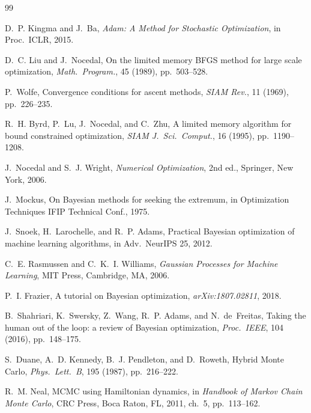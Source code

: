 \documentclass[11pt]{article}
\theoremstyle{definition}
\begin{document}

\begin{thebibliography}{99}

D.~P. Kingma and J.~Ba,
\textit{Adam: A Method for Stochastic Optimization},
in Proc.\ ICLR, 2015.

D.~C. Liu and J.~Nocedal,
On the limited memory BFGS method for large scale optimization,
\textit{Math.\ Program.}, 45 (1989), pp.~503--528.

P.~Wolfe,
Convergence conditions for ascent methods,
\textit{SIAM Rev.}, 11 (1969), pp.~226--235.

R.~H. Byrd, P.~Lu, J.~Nocedal, and C.~Zhu,
A limited memory algorithm for bound constrained optimization,
\textit{SIAM J.\ Sci.\ Comput.}, 16 (1995), pp.~1190--1208.

J.~Nocedal and S.~J. Wright,
\textit{Numerical Optimization}, 2nd ed.,
Springer, New York, 2006.

J.~Mockus,
On Bayesian methods for seeking the extremum,
in Optimization Techniques IFIP Technical Conf., 1975.

J.~Snoek, H.~Larochelle, and R.~P. Adams,
Practical Bayesian optimization of machine learning algorithms,
in Adv.\ NeurIPS 25, 2012.

C.~E. Rasmussen and C.~K.~I. Williams,
\textit{Gaussian Processes for Machine Learning},
MIT Press, Cambridge, MA, 2006.

P.~I. Frazier,
A tutorial on Bayesian optimization,
\textit{arXiv:1807.02811}, 2018.

B.~Shahriari, K.~Swersky, Z.~Wang, R.~P. Adams, and N.~de~Freitas,
Taking the human out of the loop: a review of Bayesian optimization,
\textit{Proc.\ IEEE}, 104 (2016), pp.~148--175.

S.~Duane, A.~D. Kennedy, B.~J. Pendleton, and D.~Roweth,
Hybrid Monte Carlo,
\textit{Phys.\ Lett.\ B}, 195 (1987), pp.~216--222.

R.~M. Neal,
MCMC using Hamiltonian dynamics,
in \textit{Handbook of Markov Chain Monte Carlo},
CRC Press, Boca Raton, FL, 2011, ch.~5, pp.~113--162.


\end{thebibliography}
\end{document}
